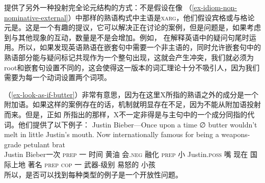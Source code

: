  \citet[\S~6]{KSF2015a}提供了另外一种投射完全论元结构的方式：不是假设在像 （\ref{ex-idiom-non-nominative-external}）中那样的熟语构式中主语是\textsc{xarg}，他们假设宾格或与格论元是\xargc。这是一个有趣的提议，它可以解决正在讨论的案例，但是问题是，如果考虑到与其他现象的互动，数量是不是会增加。例如， \citet{BF99a}在解释英语中的疑问句尾时运用\xargc。所以，如果发现英语熟语在嵌套句中需要一个非主语的\xargc，同时允许嵌套句中的熟语部分能与疑问标记共现作为一个整句出现，这就会产生冲突，我们就必须为root和嵌套句设置不同的\xargc，这会使得这一版本的词汇理论十分不吸引人，因为我们需要为每一个动词设置两个词项。

（\ref{ex-look-as-if-butter}）非常有意思，因为在这里X所指的熟语之外的成分是一个附加语。如果这样的案例存在的话，\xargc 机制就明显存在不足，因为\xargc 不能从附加语投射而来。但是，正如 \citet{KSF2015a}所指出的那样，X不一定非得是与主句中的一个成分同指的代词。他们提供了以下例子：
\ea
\gll Justin Bieber—Once upon a time ∅ butter wouldn't melt in little Justin's mouth. Now internationally famous for being a weapons-grade petulant brat\\    %
     Justin Bieber一次 \textsc{prep} 一 时间 {} 黄油 会.\textsc{neg} 融化 \textsc{prep} 小 Justin.\textsc{poss} 嘴 现在 国际上地 著名 \textsc{prep} \textsc{cop} 一 武器-级别 易怒的 小孩\\
\z
所以，是否可以找到每种类型的例子是一个开放性问题。

